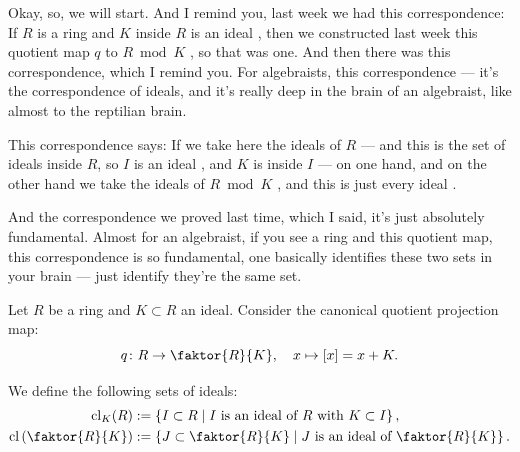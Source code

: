 \begin{speech}[00:00:01 - 00:01:36]
Okay, so, we will start. And I remind you, last week we had this correspondence: If $R$ is a ring and $K$ inside $R$ is an ideal , then we constructed last week this quotient map $q$ to $R \bmod K$ , so that was one. And then there was this correspondence, which I remind you. For algebraists, this correspondence --- it's the correspondence of ideals, and it's really deep in the brain of an algebraist, like almost to the reptilian brain.

This correspondence says: If we take here the ideals of $R$  --- and this is the set of ideals inside $R$, so $I$ is an ideal , and $K$ is inside $I$  --- on one hand, and on the other hand we take the ideals of $R \bmod K$ , and this is just every ideal .

And the correspondence we proved last time, which I said, it's just absolutely fundamental. Almost for an algebraist, if you see a ring and this quotient map, this correspondence is so fundamental, one basically identifies these two sets in your brain --- just identify they're the same set.
\end{speech}

\begin{content}
Let $R$ be a ring and $K \subset R$ an ideal. Consider the canonical quotient projection map:
\begin{equation}\label{eq:canonical-quotient-map}
q \colon R \to \faktor{R}{K}, \quad x \mapsto [x] = x + K.
\end{equation}

We define the following sets of ideals:
\begin{align}
\operatorname{cl}_K(R) &:= \left\{ I \subset R \;\middle|\; I \text{ is an ideal of } R \text{ with } K \subset I \right\}, \label{eq:ideals-containing-k} \\
\operatorname{cl}\left(\faktor{R}{K}\right) &:= \left\{ J \subset \faktor{R}{K} \;\middle|\; J \text{ is an ideal of } \faktor{R}{K} \right\}. \label{eq:ideals-in-quotient}
\end{align}
\end{content}

